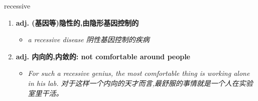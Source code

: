 
\begin{frame}
{\huge recessive}
\begin{center}
\begin{enumerate}\Large
  \item \textbf{adj. (基因等)隐性的,由隐形基因控制的}
  \begin{itemize}
    \item \em{\Large{a recessive disease 阴性基因控制的疾病}}
  \end{itemize}
  \item \textbf{adj. 内向的,内敛的: not comfortable around people}
  \begin{itemize}
    \item \em{\Large{For such a recessive genius, the most comfortable thing is working alone in his lab. 对于这样一个内向的天才而言,最舒服的事情就是一个人在实验室里干活。}}
  \end{itemize}
\end{enumerate}
\end{center}
\end{frame}
